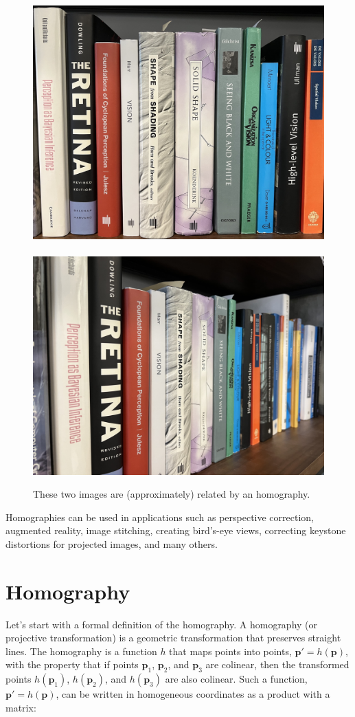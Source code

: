 \begin{figure}[h!]
    \centerline{
        \includegraphics[width=.455\linewidth]{figures/homography/IMG_7801_crop.jpg}
        ~~
        \includegraphics[width=.49\linewidth]{figures/homography/IMG_7802_crop.jpg}
    }
    \caption{These two images are (approximately) related by an homography.}
    \label{fig:illustration_homography}
\end{figure}

Homographies can be used in applications such as perspective correction, augmented reality, image stitching, creating bird's-eye views, correcting keystone distortions for projected images, and many others.


\section{Homography}

Let's start with a formal definition of the homography. A homography (or projective transformation) is a geometric transformation that preserves straight lines.
The homography is a function $h$ that maps points into points, $\mathbf{p}' = h(\mathbf{p})$, with the property that if points  $\mathbf{p}_1$, $\mathbf{p}_2$, and $\mathbf{p}_3$ are colinear, then the transformed points $h(\mathbf{p}_1)$, $h(\mathbf{p}_2)$, and $h(\mathbf{p}_3)$ are also colinear. Such a function,  $\mathbf{p}' = h(\mathbf{p})$, can be written in homogeneous coordinates as a product with a matrix:

